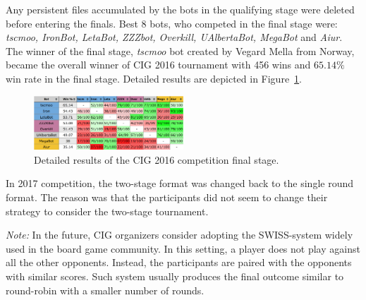 Any persistent files accumulated by the bots in the qualifying stage were deleted before entering the finals. 
Best 8 bots, who competed in the final stage were: {\em tscmoo, IronBot, LetaBot, ZZZbot, Overkill, UAlbertaBot, MegaBot} and {\em Aiur}.
The winner of the final stage, {\em tscmoo} bot created by Vegard Mella from Norway, became the overall winner of CIG 2016 tournament with 456 wins and $65.14\%$ win rate in the final stage. Detailed results are depicted in Figure~\ref{figCIGresults}. 

\begin{figure}[h]
  \centering
  \includegraphics[width=0.5\textwidth]{fig/cig-results.png}
  \caption{Detailed results of the CIG 2016 competition final stage.}
  \label{figCIGresults}
\end{figure}

In 2017 competition, the two-stage format was changed back to the single round format. The reason was that the participants did not seem to change their strategy to consider the two-stage tournament. 

{\em Note:} In the future, CIG organizers consider adopting the SWISS-system widely used in the board game community. In this setting, a player does not play against all the other opponents. Instead, the participants are paired with the opponents with similar scores. Such system usually produces the final outcome similar to round-robin with a smaller number of rounds. 

